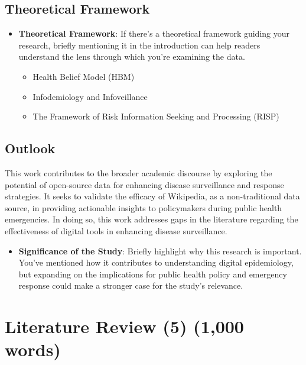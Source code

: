 \documentclass[
  12pt,
]{article}
\providecommand{\tightlist}{%
  \setlength{\itemsep}{0pt}\setlength{\parskip}{0pt}}\usepackage{longtable,booktabs,array}
\begin{document}
\subsection{Theoretical Framework}\label{theoretical-framework}

\begin{itemize}
\item
  \textbf{Theoretical Framework}: If there's a theoretical framework
  guiding your research, briefly mentioning it in the introduction can
  help readers understand the lens through which you're examining the
  data.

  \begin{itemize}
  \item
    Health Belief Model (HBM)
  \item
    Infodemiology and Infoveillance
  \item
    The Framework of Risk Information Seeking and Processing (RISP)
  \end{itemize}
\end{itemize}

\subsection{Outlook}\label{outlook}

This work contributes to the broader academic discourse by exploring the
potential of open-source data for enhancing disease surveillance and
response strategies. It seeks to validate the efficacy of Wikipedia, as
a non-traditional data source, in providing actionable insights to
policymakers during public health emergencies. In doing so, this work
addresses gaps in the literature regarding the effectiveness of digital
tools in enhancing disease surveillance.

\begin{itemize}
\tightlist
\item
  \textbf{Significance of the Study}: Briefly highlight why this
  research is important. You've mentioned how it contributes to
  understanding digital epidemiology, but expanding on the implications
  for public health policy and emergency response could make a stronger
  case for the study's relevance.
\end{itemize}

\section{Literature Review (5) (1,000
words)}\label{literature-review-5-1000-words}
\end{document}
